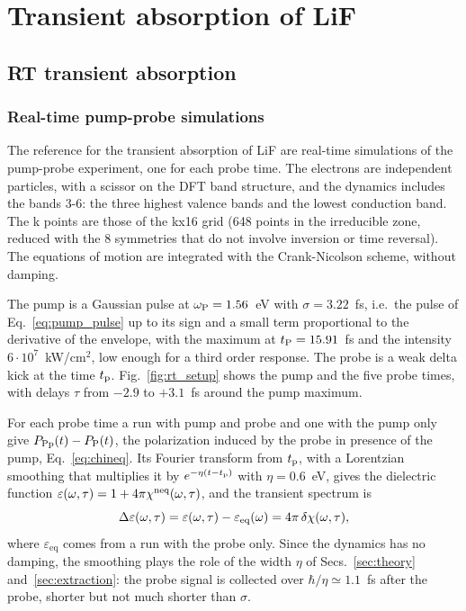 \documentclass[10pt,a4paper]{paper}
\begin{document}
\section{Transient absorption of LiF}
\label{sec:lif}

\subsection{RT transient absorption}
\label{sec:lif_rt}

\subsubsection{Real-time pump-probe simulations}
\label{sec:lif_rt_setup}

The reference for the transient absorption of LiF are real-time simulations of the pump-probe experiment, one for each
probe time. The electrons are independent
particles, with a scissor on the DFT band structure, and the dynamics includes the bands 3-6: the three highest
valence bands and the lowest conduction band. The k points are those of the kx16 grid (648 points in the irreducible
zone, reduced with the 8 symmetries that do not involve inversion or time reversal). The equations of motion are
integrated with the Crank-Nicolson scheme, without damping.

The pump is a Gaussian pulse at $\omega_{\mathrm{P}} = 1.56$~eV with $\sigma = 3.22$~fs, i.e.\ the pulse of Eq.~\eqref{eq:pump_pulse}
up to its sign and a small term proportional to the derivative of the envelope, with the maximum at $t_{\mathrm{P}} = 15.91$~fs
and the intensity $6\cdot10^7$~kW/cm$^2$, low enough for a third order response. The probe is a weak delta kick at
the time $t_{\mathrm{p}}$. Fig.~\ref{fig:rt_setup} shows the pump and the five probe times, with delays $\tau$ from $-2.9$ to
$+3.1$~fs around the pump maximum.

For each probe time a run with pump and probe and one with the pump only give $P_{\mathrm{Pp}}(t)-P_{\mathrm{P}}(t)$, the polarization
induced by the probe in presence of the pump, Eq.~\eqref{eq:chineq}. Its Fourier transform from $t_{\mathrm{p}}$, with a
Lorentzian smoothing that multiplies it by $e^{-\eta(t-t_{\mathrm{p}})}$ with $\eta = 0.6$~eV, gives the dielectric function
$\varepsilon(\omega,\tau) = 1+4\pi\chi^{\mathrm{neq}}(\omega,\tau)$, and the transient spectrum is
\begin{equation}
\Delta\varepsilon(\omega,\tau) = \varepsilon(\omega,\tau)-\varepsilon_{\mathrm{eq}}(\omega) = 4\pi\,\delta\chi(\omega,\tau) ,
\label{eq:deps}
\end{equation}
where $\varepsilon_{\mathrm{eq}}$ comes from a run with the probe only. Since the dynamics has no damping, the
smoothing plays the role of the width $\eta$ of Secs.~\ref{sec:theory} and~\ref{sec:extraction}: the probe signal is
collected over $\hbar/\eta\simeq1.1$~fs after the probe, shorter but not much shorter than $\sigma$.
\end{document}

